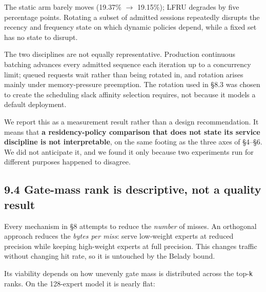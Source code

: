 \documentclass[
  10pt,
  letterpaper,
  10pt]{article}
\begin{document}
The static arm barely moves (19.37\% \ensuremath{\rightarrow} 19.15\%);
LFRU degrades by five percentage points. Rotating a subset of admitted
sessions repeatedly disrupts the recency and frequency state on which
dynamic policies depend, while a fixed set has no state to disrupt.

The two disciplines are not equally representative. Production
continuous batching advances every admitted sequence each iteration up
to a concurrency limit; queued requests wait rather than being rotated
in, and rotation arises mainly under memory-pressure preemption. The
rotation used in §8.3 was chosen to create the scheduling slack affinity
selection requires, not because it models a default deployment.

We report this as a measurement result rather than a design
recommendation. It means that \textbf{a residency-policy comparison that
does not state its service discipline is not interpretable}, on the same
footing as the three axes of §4--§6. We did not anticipate it, and we
found it only because two experiments run for different purposes
happened to disagree.

\subsection{9.4 Gate-mass rank is descriptive, not a quality
result}\label{gate-mass-rank-is-descriptive-not-a-quality-result}

Every mechanism in §8 attempts to reduce the \emph{number} of misses. An
orthogonal approach reduces the \emph{bytes per miss}: serve low-weight
experts at reduced precision while keeping high-weight experts at full
precision. This changes traffic without changing hit rate, so it is
untouched by the Belady bound.

Its viability depends on how unevenly gate mass is distributed across
the top-\texttt{k} ranks. On the 128-expert model it is nearly flat:
\end{document}

